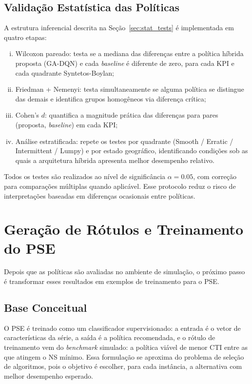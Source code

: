 \subsection{Validação Estatística das Políticas}

A estrutura inferencial descrita na Seção~\ref{sec:stat_tests} é implementada em quatro etapas:

\begin{enumerate}[(i)]
  \item Wilcoxon pareado: testa se a mediana das diferenças entre a política híbrida proposta (GA-DQN) e cada \textit{baseline} é diferente de zero, para cada KPI e cada quadrante Syntetos-Boylan;
  \item Friedman + Nemenyi: testa simultaneamente se alguma política se distingue das demais e identifica grupos homogêneos via diferença crítica;
  \item Cohen's $d$: quantifica a magnitude prática das diferenças para pares (proposta, \textit{baseline}) em cada KPI;
  \item Análise estratificada: repete os testes por quadrante (Smooth / Erratic / Intermittent / Lumpy) e por estado geográfico, identificando condições sob as quais a arquitetura híbrida apresenta melhor desempenho relativo.
\end{enumerate}

Todos os testes são realizados ao nível de significância $\alpha = 0.05$, com correção para comparações múltiplas quando aplicável. Esse protocolo reduz o risco de interpretações baseadas em diferenças ocasionais entre políticas.

\section{Geração de Rótulos e Treinamento do PSE}
\label{sec:selecao_contextual}

Depois que as políticas são avaliadas no ambiente de simulação, o próximo passo é transformar esses resultados em exemplos de treinamento para o PSE.

\subsection{Base Conceitual}

O PSE é treinado como um classificador supervisionado: a entrada é o vetor de características da série, a saída é a política recomendada, e o rótulo de treinamento vem do \textit{benchmark} simulado: a política viável de menor CTI entre as que atingem o NS mínimo. Essa formulação se aproxima do problema de seleção de algoritmos, pois o objetivo é escolher, para cada instância, a alternativa com melhor desempenho esperado.


